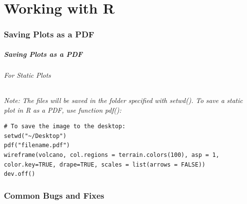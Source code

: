 \part{Working with R}
\section{Saving Plots as a PDF} 
\begin{frame}[fragile]
\frametitle{Saving Plots as a PDF}
  \framesubtitle{For Static Plots}

  \itshape Note: \normalfont The files will be saved in the folder specified with \ttfamily setwd(). \normalfont
  To save a static plot in \ttfamily R \normalfont as a PDF, use function \ttfamily pdf(): \normalfont

  \begin{lstlisting}
# To save the image to the desktop:
setwd("~/Desktop")
pdf("filename.pdf")
wireframe(volcano, col.regions = terrain.colors(100), asp = 1, color.key=TRUE, drape=TRUE, scales = list(arrows = FALSE))
dev.off()
  \end{lstlisting}

\end{frame}





\section{Common Bugs and Fixes}

